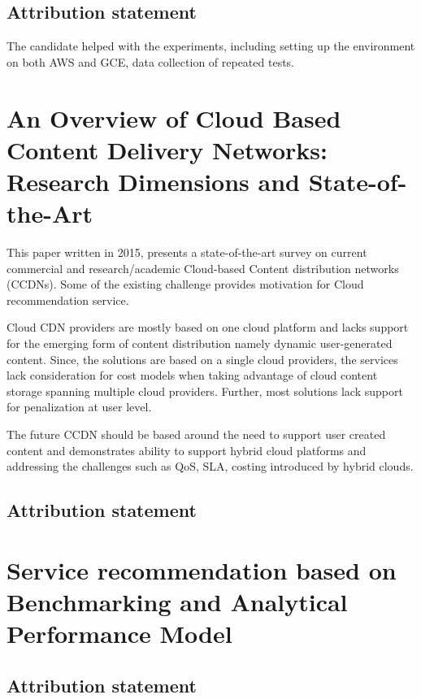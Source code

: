 \subsection{Attribution statement}
The candidate helped with the experiments, including setting up the environment on both AWS and GCE, data collection of repeated tests.

\section{An Overview of Cloud Based Content Delivery Networks: Research Dimensions and State-of-the-Art}

This paper written in 2015, presents a state-of-the-art survey on current commercial and research/academic Cloud-based Content distribution networks (CCDNs). Some of the existing challenge provides motivation for Cloud recommendation service.

Cloud CDN providers are mostly based on one cloud platform and lacks support for the emerging form of content distribution namely dynamic user-generated content. Since, the solutions are based on a single cloud providers, the services lack consideration for cost models when taking advantage of cloud content storage spanning multiple cloud providers. Further, most solutions lack support for penalization at user level. 

The future CCDN should be based around the need to support user created content and demonstrates ability to support hybrid cloud platforms and addressing the challenges such as QoS, SLA, costing introduced by hybrid clouds.

\subsection{Attribution statement}

\section{Service recommendation based on Benchmarking and Analytical Performance Model}
\subsection{Attribution statement}